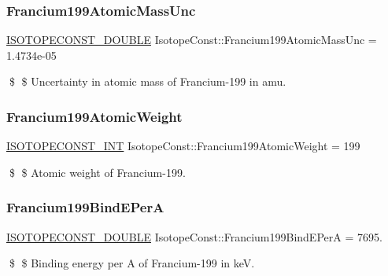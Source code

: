 \subsubsection{\texorpdfstring{Francium199\+Atomic\+Mass\+Unc}{Francium199AtomicMassUnc}}
{\footnotesize\ttfamily \mbox{\hyperlink{group___isotope_const-_macros_ga8f45a7272ce02c0b4c65c44636ed719a}{I\+S\+O\+T\+O\+P\+E\+C\+O\+N\+S\+T\+\_\+\+D\+O\+U\+B\+LE}} Isotope\+Const\+::\+Francium199\+Atomic\+Mass\+Unc = 1.\+4734e-\/05}

\$ \$ Uncertainty in atomic mass of Francium-\/199 in amu. \mbox{\label{group___isotope_const-_francium-_fr199_ga3d8084057412e9c7b46eff1a8275d99b}} 
\subsubsection{\texorpdfstring{Francium199\+Atomic\+Weight}{Francium199AtomicWeight}}
{\footnotesize\ttfamily \mbox{\hyperlink{group___isotope_const-_macros_ga5f18360b3e99483a35c32d789e62621c}{I\+S\+O\+T\+O\+P\+E\+C\+O\+N\+S\+T\+\_\+\+I\+NT}} Isotope\+Const\+::\+Francium199\+Atomic\+Weight = 199}

\$ \$ Atomic weight of Francium-\/199. \mbox{\label{group___isotope_const-_francium-_fr199_gab0c34e83ba8534ea38b1fd7a2009f442}} 
\subsubsection{\texorpdfstring{Francium199\+Bind\+E\+PerA}{Francium199BindEPerA}}
{\footnotesize\ttfamily \mbox{\hyperlink{group___isotope_const-_macros_ga8f45a7272ce02c0b4c65c44636ed719a}{I\+S\+O\+T\+O\+P\+E\+C\+O\+N\+S\+T\+\_\+\+D\+O\+U\+B\+LE}} Isotope\+Const\+::\+Francium199\+Bind\+E\+PerA = 7695.}

\$ \$ Binding energy per A of Francium-\/199 in keV. \mbox{\label{group___isotope_const-_francium-_fr199_gaff70c24fe47d4f0ded4f9982700606ec}} 
